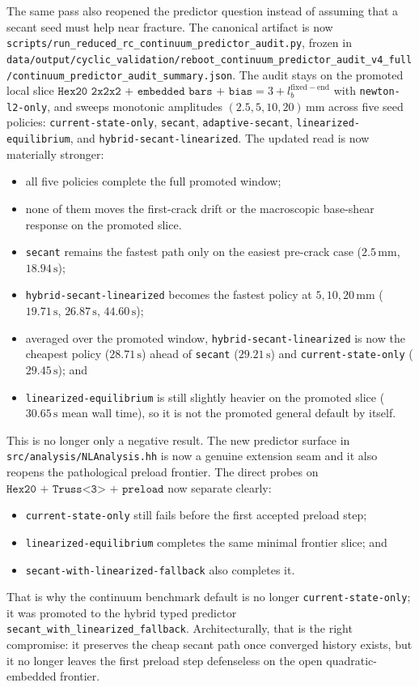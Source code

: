 The same pass also reopened the predictor question instead of assuming that a
secant seed must help near fracture. The canonical artifact is now
\texttt{scripts/run\_reduced\_rc\_continuum\_predictor\_audit.py}, frozen in
\texttt{data/output/cyclic\_validation/reboot\_continuum\_predictor\_audit\_v4\_full/continuum\_predictor\_audit\_summary.json}.
The audit stays on the promoted local slice
\(\texttt{Hex20 2x2x2 + embedded bars + bias}=3 + l_b^{\mathrm{fixed-end}}\)
with \texttt{newton-l2-only}, and sweeps monotonic amplitudes
\((2.5,5,10,20)\,\mathrm{mm}\) across five seed policies:
\texttt{current-state-only}, \texttt{secant}, \texttt{adaptive-secant},
\texttt{linearized-equilibrium}, and
\texttt{hybrid-secant-linearized}. The updated read is now materially stronger:
\begin{itemize}
  \item all five policies complete the full promoted window;
  \item none of them moves the first-crack drift or the
    macroscopic base-shear response on the promoted slice.
  \item \texttt{secant} remains the fastest path only on the easiest
    pre-crack case (\(2.5\,\mathrm{mm}\), \(18.94\,\mathrm{s}\));
  \item \texttt{hybrid-secant-linearized} becomes the fastest policy at
    \(5,10,20\,\mathrm{mm}\)
    (\(19.71\,\mathrm{s}\), \(26.87\,\mathrm{s}\), \(44.60\,\mathrm{s}\));
  \item averaged over the promoted window,
    \texttt{hybrid-secant-linearized} is now the cheapest policy
    (\(28.71\,\mathrm{s}\)) ahead of \texttt{secant}
    (\(29.21\,\mathrm{s}\)) and \texttt{current-state-only}
    (\(29.45\,\mathrm{s}\)); and
  \item \texttt{linearized-equilibrium} is still slightly heavier on the
    promoted slice (\(30.65\,\mathrm{s}\) mean wall time), so it is not the
    promoted general default by itself.
\end{itemize}

This is no longer only a negative result. The new predictor surface in
\texttt{src/analysis/NLAnalysis.hh} is now a genuine extension seam and it also
reopens the pathological preload frontier. The direct probes on
\(\texttt{Hex20 + Truss<3> + preload}\) now separate clearly:
\begin{itemize}
  \item \texttt{current-state-only} still fails before the first accepted
    preload step;
  \item \texttt{linearized-equilibrium} completes the same minimal frontier
    slice; and
  \item \texttt{secant-with-linearized-fallback} also completes it.
\end{itemize}
That is why the continuum benchmark default is no longer
\texttt{current-state-only}; it was promoted to the hybrid typed predictor
\texttt{secant\_with\_linearized\_fallback}. Architecturally, that is the right
compromise: it preserves the cheap secant path once converged history exists,
but it no longer leaves the first preload step defenseless on the open
quadratic-embedded frontier.

